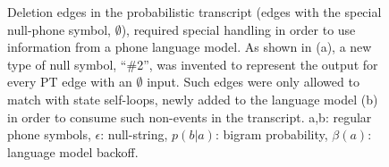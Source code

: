 \begin{figure}
\begin{center}
\end{center}
\vspace*{-2mm}
\caption{Deletion edges in the probabilistic transcript (edges with
  the special null-phone symbol, $\emptyset$), required special
  handling in order to use information from a phone language
  model.  As shown in (a), a new type of null symbol, ``\#2'', was invented
  to represent the output for every PT edge with an $\emptyset$ input.
  Such edges were only allowed to match with state
  self-loops, newly added to the language model (b) in order to
  consume such non-events in the transcript.  a,b: regular phone
  symbols, $\epsilon$: null-string, $p(b|a)$: bigram probability,
  $\beta(a)$: language model backoff.}
\label{fig:liu1}
\end{figure}

